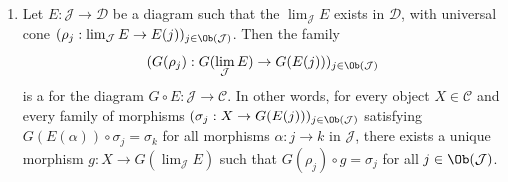 \begin{theorem}
\begin{enumerate}
        \item \label{item:right_adjoint_preserves_limits} Let $E : \mathcal{J} \to \mathcal{D}$ be a diagram such that the  $\lim_{\mathcal{J}} E$ exists in $\mathcal{D}$, with universal cone $(\rho_j : \lim_{\mathcal{J}} E \to E(j))_{j \in \Ob(\mathcal{J})}$. Then the family
        $$
        (G(\rho_j) : G(\lim_{\mathcal{J}} E) \to G(E(j)))_{j \in \Ob(\mathcal{J})}
        $$
        is a  for the diagram $G \circ E : \mathcal{J} \to \mathcal{C}$. In other words, for every object $X \in \mathcal{C}$ and every family of morphisms $(\sigma_j : X \to G(E(j)))_{j \in \Ob(\mathcal{J})}$ satisfying $G(E(\alpha)) \circ \sigma_j = \sigma_k$ for all morphisms $\alpha : j \to k$ in $\mathcal{J}$, there exists a unique morphism $g : X \to G(\lim_{\mathcal{J}} E)$ such that $G(\rho_j) \circ g = \sigma_j$ for all $j \in \Ob(\mathcal{J})$.
    \end{enumerate}
\end{theorem}


